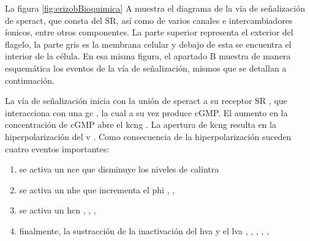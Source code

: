 La figura \ref{fig:erizobBioquimica} \textsc{A} muestra el diagrama de la vía de señalización de speract, que consta del \ac{SR}, así como de varios canales e intercambiadores íonicos, entre otros componentes. La parte superior representa el exterior del flagelo, la parte gris es la membrana celular y debajo de esta se encuentra el interior de la célula. En esa misma figura, el apartado \textsc{B} muestra de manera esquemática los eventos de la vía de señalización, mismos que se detallan a continuación.

La vía de señalización inicia con la unión de speract a su receptor \acs{SR} \citeauthor{Darszon2008} \citep{Darszon2008}, que interacciona con una \ac{gc} \citeauthor{Garbers:1976wy} \citep{Garbers:1976wy}, la cual a su vez produce \ac{cGMP}. El aumento en la concentración de \ac{cGMP} abre el \ac{kcng} \citeauthor{Galindo:2007bx} \citep{Galindo:2007bx}. La apertura de \ac{kcng} resulta en la hiperpolarización del \ac{v} \citeauthor{Strunker:2006tk} \citep{Strunker:2006tk}. Como consecuencia de la hiperpolarización suceden cuatro eventos importantes:
\begin{enumerate}
\item se activa un \ac{nce} que disminuye los niveles de \ac{calintra} \citeauthor{Nishigaki:2004p4516} \citep{Nishigaki:2004p4516} 
\item se activa un \ac{nhe} que incrementa el \ac{phi} \citeauthor{Lee:1986vs} \citep{Lee:1986vs} \citeauthor{Wang:2003ke} \citep{Wang:2003ke}, \citeauthor{Su:2002fk} \citep{Su:2002fk}, \citeauthor{Rodriguez:2003do} \citep{Rodriguez:2003do}
\item se activa un \ac{hcn} \citeauthor{Nishigaki:2004p4516} \citep{Nishigaki:2004p4516}, \citeauthor{Rodriguez:2003do} \citep{Rodriguez:2003do}, \citeauthor{Gauss:1998de} \citep{Gauss:1998de}, \citeauthor{Galindo:2005wf} \citep{Galindo:2005wf}
\item finalmente, la sustracción de la inactivación del \ac{hva} y el \ac{lva} \citeauthor{Strunker:2006tk} \citep{Strunker:2006tk}, \citeauthor{GranadosGonzalez:2005ia} \citep{GranadosGonzalez:2005ia}, \citeauthor{Wood:2003p4517} \citep{Wood:2003p4517}, \citeauthor{Wood:2005gg} \citep{Wood:2005gg}, \citeauthor{Darszon:2005tb} \cite{Darszon:2005tb}, \citeauthor{PerezReyes:2003bw} \citep{PerezReyes:2003bw}
\end{enumerate}


